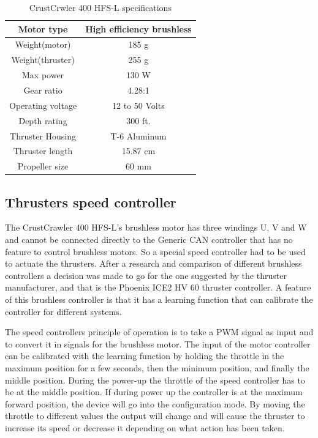 \begin{table}[h]
\centering
    \caption{CrustCrwler 400 HFS-L specifications}
    \begin{tabular}{|c|c|} \hline
    \label{table:one_column}
       Motor type    &  High efficiency brushless \\ \hline
       Weight(motor) & 185 g \\ \hline
         Weight(thruster) & 255 g \\ \hline
           Max power &  130 W \\ \hline
             Gear ratio & 4.28:1 \\ \hline
               Operating voltage & 12 to 50 Volts \\ \hline
                 Depth rating  & 300 ft. \\ \hline
                   Thruster Housing & T-6 Aluminum \\ \hline
                     Thruster length & 15.87 cm \\ \hline  
                      Propeller size & 60 mm \\ \hline
     
    \end{tabular}
\end{table}
 
\subsection{Thrusters speed controller}
The CrustCrawler 400 HFS-L's brushless motor has three windings U, V and W and cannot be connected directly to the Generic CAN controller that has no feature to control brushless motors. So a special speed controller had to be used to actuate the thrusters. After a research and comparison of different brushless controllers a decision was made to go for the one suggested by the thruster manufacturer, and that is the Phoenix ICE2 HV 60 thruster controller. A feature of this brushless controller is that it has a learning function that can calibrate the controller for different systems. 

The speed controllers principle of operation is to take a PWM signal as input
and to convert it in signals for the brushless motor. The input of the
motor controller \cite{web:motor} can be calibrated with the
learning function by holding the throttle in the maximum position
for a few seconds, then  the minimum position, and finally the middle
position. During the power-up the throttle of the speed controller has
to be at the middle position. If during power up  the controller is at
the maximum forward position, the device will  go into the configuration
mode. By moving the throttle to different values the output will change and
will cause the thruster to increase its speed or decrease it depending on
what action has been taken.

